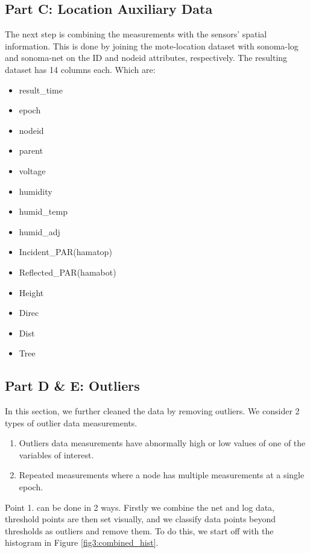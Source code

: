 \documentclass[11pt, letterpaper]{article}
\begin{document}
\subsection{Part C: Location Auxiliary Data}
The next step is combining the measurements with the sensors' spatial information. This is done by joining the mote-location dataset with sonoma-log and sonoma-net on the ID and nodeid attributes, respectively. The resulting dataset has 14 columns each. Which are:
    \begin{multicols}{3}
    \begin{itemize}
        \item result\_time
        \item epoch
        \item nodeid
        \item parent
        \item voltage
        \item humidity
        \item humid\_temp
        \item humid\_adj
        \item Incident\_PAR(hamatop)
        \item Reflected\_PAR(hamabot)
        \item Height
        \item Direc
        \item Dist
        \item Tree
    \end{itemize}
    \end{multicols}

\subsection{Part D \& E: Outliers}
In this section, we further cleaned the data by removing outliers. We consider 2 types of outlier data measurements. 
\begin{enumerate}
    \item Outliers data measurements have abnormally high or low values of one of the variables of interest.
    \item Repeated measurements where a node has multiple measurements at a single epoch.
\end{enumerate}
Point 1. can be done in 2 ways. Firstly we combine the net and log data, threshold points are then set visually, and we classify data points beyond thresholds as outliers and remove them. To do this, we start off with the histogram in Figure \ref{fig3:combined_hist}. 
\end{document}
